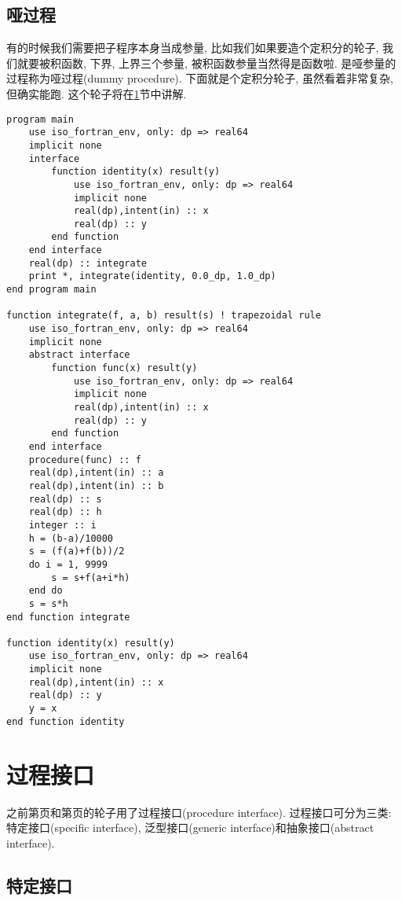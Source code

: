 \subsection{哑过程}
有的时候我们需要把子程序本身当成参量, 比如我们如果要造个定积分的轮子, 我们就要被积函数, 下界, 上界三个参量, 被积函数参量当然得是函数啦. 是哑参量的过程称为哑过程(dummy procedure). 下面就是个定积分轮子, 虽然看着非常复杂, 但确实能跑. 这个轮子将在\ref{fortran_interface}节中讲解.\label{dummy_procedure_program}
\begin{lstlisting}
program main
    use iso_fortran_env, only: dp => real64
    implicit none
    interface
        function identity(x) result(y)
            use iso_fortran_env, only: dp => real64
            implicit none
            real(dp),intent(in) :: x
            real(dp) :: y
        end function
    end interface
    real(dp) :: integrate
    print *, integrate(identity, 0.0_dp, 1.0_dp)
end program main

function integrate(f, a, b) result(s) ! trapezoidal rule
    use iso_fortran_env, only: dp => real64
    implicit none
    abstract interface
        function func(x) result(y)
            use iso_fortran_env, only: dp => real64
            implicit none
            real(dp),intent(in) :: x
            real(dp) :: y
        end function
    end interface
    procedure(func) :: f
    real(dp),intent(in) :: a
    real(dp),intent(in) :: b
    real(dp) :: s
    real(dp) :: h
    integer :: i
    h = (b-a)/10000
    s = (f(a)+f(b))/2
    do i = 1, 9999
        s = s+f(a+i*h)
    end do
    s = s*h
end function integrate

function identity(x) result(y)
    use iso_fortran_env, only: dp => real64
    implicit none
    real(dp),intent(in) :: x
    real(dp) :: y
    y = x
end function identity
\end{lstlisting}

\section{过程接口}\label{fortran_interface}

之前第\pageref{assumed-shape_array_program}页和第\pageref{dummy_procedure_program}页的轮子用了过程接口(procedure interface). 过程接口可分为三类: 特定接口(specific interface), 泛型接口(generic interface)和抽象接口(abstract interface).

\subsection{特定接口}

